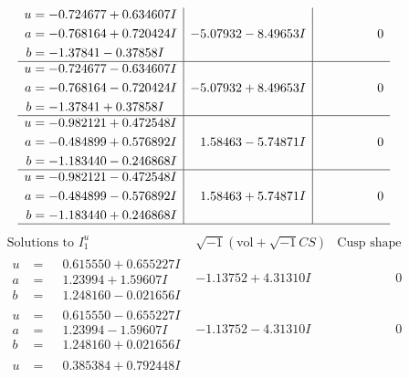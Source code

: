 \documentclass[1p]{elsarticle_modified}
\theoremstyle{definition}
\newcommand{\I}{\sqrt{-1}}
\begin{document}
$$\begin{array}{c|c|c}
\begin{aligned}
u &= -0.724677 + 0.634607 I \\
a &= -0.768164 + 0.720424 I \\
b &= -1.37841 - 0.37858 I\end{aligned}
 & -5.07932 - 8.49653 I & \phantom{-0.000000 } 0 \\ \hline\begin{aligned}
u &= -0.724677 - 0.634607 I \\
a &= -0.768164 - 0.720424 I \\
b &= -1.37841 + 0.37858 I\end{aligned}
 & -5.07932 + 8.49653 I & \phantom{-0.000000 } 0 \\ \hline\begin{aligned}
u &= -0.982121 + 0.472548 I \\
a &= -0.484899 + 0.576892 I \\
b &= -1.183440 - 0.246868 I\end{aligned}
 & \phantom{-}1.58463 - 5.74871 I & \phantom{-0.000000 } 0 \\ \hline\begin{aligned}
u &= -0.982121 - 0.472548 I \\
a &= -0.484899 - 0.576892 I \\
b &= -1.183440 + 0.246868 I\end{aligned}
 & \phantom{-}1.58463 + 5.74871 I & \phantom{-0.000000 } 0\\
 \hline 
 \end{array}$$\newpage$$\begin{array}{c|c|c}  
\text{Solutions to }I^u_{1}& \I (\text{vol} + \sqrt{-1}CS) & \text{Cusp shape}\\
 \hline 
\begin{aligned}
u &= \phantom{-}0.615550 + 0.655227 I \\
a &= \phantom{-}1.23994 + 1.59607 I \\
b &= \phantom{-}1.248160 - 0.021656 I\end{aligned}
 & -1.13752 + 4.31310 I & \phantom{-0.000000 } 0 \\ \hline\begin{aligned}
u &= \phantom{-}0.615550 - 0.655227 I \\
a &= \phantom{-}1.23994 - 1.59607 I \\
b &= \phantom{-}1.248160 + 0.021656 I\end{aligned}
 & -1.13752 - 4.31310 I & \phantom{-0.000000 } 0 \\ \hline\begin{aligned}
u &= \phantom{-}0.385384 + 0.792448 I \\

\end{aligned}
\end{array}$$
\end{document}
